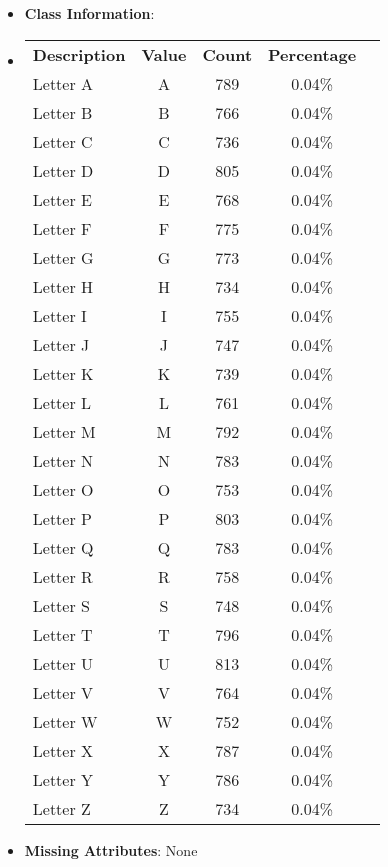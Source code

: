 \documentclass[11pt]{article}
\newcommand{\bb}{\textbf}
\begin{document}
\begin{itemize}[leftmargin=*]
  \item[] \bb{Class Information}:
  \item[]
  \begin{tabular}{l c c c c }
    \bb{Description} & \bb{Value} & \bb{Count} & \bb{Percentage} \\
    Letter A                & A          & 789        & 0.04\% \\
    Letter B                & B          & 766        & 0.04\% \\
    Letter C                & C          & 736        & 0.04\% \\
    Letter D                & D          & 805        & 0.04\% \\
    Letter E                & E          & 768        & 0.04\% \\
    Letter F                & F          & 775        & 0.04\% \\
    Letter G                & G          & 773        & 0.04\% \\
    Letter H                & H          & 734        & 0.04\% \\
    Letter I                & I          & 755        & 0.04\% \\
    Letter J                & J          & 747        & 0.04\% \\
    Letter K                & K          & 739        & 0.04\% \\
    Letter L                & L          & 761        & 0.04\% \\
    Letter M                & M          & 792        & 0.04\% \\
    Letter N                & N          & 783        & 0.04\% \\
    Letter O                & O          & 753        & 0.04\% \\
    Letter P                & P          & 803        & 0.04\% \\
    Letter Q                & Q          & 783        & 0.04\% \\
    Letter R                & R          & 758        & 0.04\% \\
    Letter S                & S          & 748        & 0.04\% \\
    Letter T                & T          & 796        & 0.04\% \\
    Letter U                & U          & 813        & 0.04\% \\
    Letter V                & V          & 764        & 0.04\% \\
    Letter W                & W          & 752        & 0.04\% \\
    Letter X                & X          & 787        & 0.04\% \\
    Letter Y                & Y          & 786        & 0.04\% \\
    Letter Z                & Z          & 734        & 0.04\%
  \end{tabular}
  \item[] \bb{Missing Attributes}: None
\end{itemize}
\end{document}
